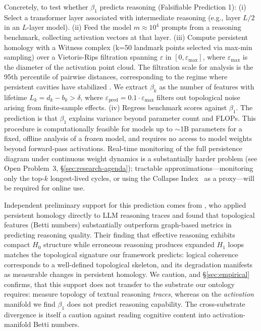 \documentclass{article}
\begin{document}
\noindent Concretely, to test whether $\beta_1$ predicts reasoning (Falsifiable Prediction 1): (i) Select a transformer layer associated with intermediate reasoning (e.g., layer $L/2$ in an $L$-layer model). (ii) Feed the model $m \approx 10^4$ prompts from a reasoning benchmark, collecting activation vectors at that layer. (iii) Compute persistent homology with a Witness complex (k=50 landmark points selected via max-min sampling) over a Vietoris-Rips filtration spanning $\varepsilon$ in $[0, \varepsilon_{\max}]$, where $\varepsilon_{\max}$ is the diameter of the activation point cloud. The filtration scale for analysis is the 95th percentile of pairwise distances, corresponding to the regime where persistent cavities have stabilized \citep{otter2017roadmap}. We extract $\beta_k$ as the number of features with lifetime $L_k = d_k - b_k > \delta$, where $\varepsilon_{\text{pred}} = 0.1 \cdot \varepsilon_{\max}$ filters out topological noise arising from finite-sample effects. (iv) Regress benchmark scores against $\beta_1$. The prediction is that $\beta_1$ explains variance beyond parameter count and FLOPs. This procedure is computationally feasible for models up to $\sim$1B parameters for a fixed, offline analysis of a frozen model, and requires no access to model weights beyond forward-pass activations. Real-time monitoring of the full persistence diagram under continuous weight dynamics is a substantially harder problem (see Open Problem~3, \S\ref{sec:research-agenda}); tractable approximations---monitoring only the top-$k$ longest-lived cycles, or using the Collapse Index~\citep{Kalinowski2026collapse} as a proxy---will be required for online use.

\medskip\noindent Independent preliminary support for this prediction comes from \citet{Tan2025shape}, who applied persistent homology directly to LLM reasoning traces and found that topological features (Betti numbers) substantially outperform graph-based metrics in predicting reasoning quality. Their finding that effective reasoning exhibits compact $H_0$ structure while erroneous reasoning produces expanded $H_1$ loops matches the topological signature our framework predicts: logical coherence corresponds to a well-defined topological skeleton, and its degradation manifests as measurable changes in persistent homology. We caution, and \S\ref{sec:empirical} confirms, that this support does not transfer to the substrate our ontology requires: \citet{Tan2025shape} measure topology of textual reasoning \emph{traces}, whereas on the \emph{activation} manifold we find $\beta_1$ does not predict reasoning capability. The cross-substrate divergence is itself a caution against reading cognitive content into activation-manifold Betti numbers.
\end{document}
